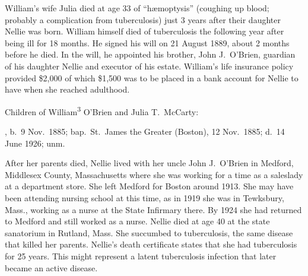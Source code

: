 William's wife Julia died at age 33 of ``h\ae moptysis'' (coughing up blood; probably a complication from tuberculosis) just 3 years after their daughter Nellie was born.\cite{JuliaMcCartyDeath:2} William himself died of tuberculosis the following year after being ill for 18 months.\cite{William3OBrienDeath:2} He signed his will on 21 August 1889, about 2 months before he died. In the will, he appointed his brother, John J.\ O'Brien, guardian of his daughter Nellie and executor of his estate. William's life insurance policy provided \$2,000 of which \$1,500 was to be placed in a bank account for Nellie to have when she reached adulthood.\cite{WilliamOBrienWill}

\begin{KidsIntro}
	Children of William\textsuperscript{3} O'Brien and Julia T.\ McCarty:
\end{KidsIntro}

\begin{Kids}
	, b.\ 9 Nov.\ 1885;\cite{Ellen4OBrienBirth} bap.\ St.\ James the Greater (Boston), 12 Nov.\ 1885;\cite{Ellen4OBrienBaptism} d.\ 14 June 1926;\cite{Ellen4OBrienDeath:1} unm.
	
	\begin{KidsMoreText}
		After her parents died, Nellie lived with her uncle John J.\ O'Brien in Medford, Middlesex County, Massachusetts\cite{Census1900EllenOBrien} where she was working for a time as a saleslady at a department store.\cite{Census1910EllenOBrien} She left Medford for Boston around 1913.\cite{Ellen4OBrien1914} She may have been attending nursing school at this time, as in 1919 she was in Tewksbury, Mass., working as a nurse at the State Infirmary there.\cite{Ellen4OBrien1919} By 1924 she had returned to Medford and still worked as a nurse.\cite{Ellen4OBrien1924} Nellie died at age 40 at the state sanatorium in Rutland, Mass.\cite{Ellen4OBrienDeath:2} She succumbed to tuberculosis,\cite{Ellen4OBrienDeath2:1} the same disease that killed her parents. Nellie's death certificate states that she had tuberculosis for 25 years.\cite{Ellen4OBrienDeath2:2} This might represent a latent tuberculosis infection that later became an active disease.\cite{CDC}
	\end{KidsMoreText}

\end{Kids}